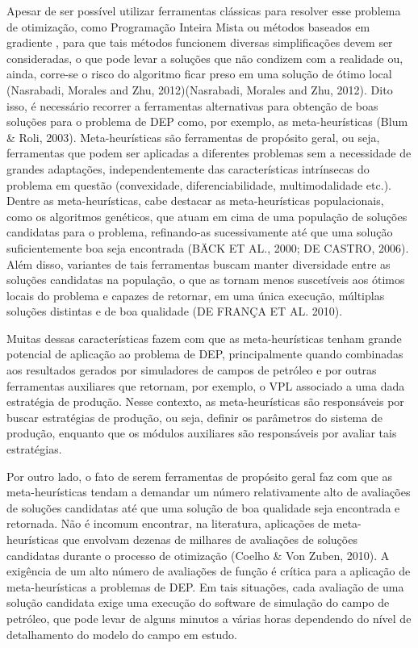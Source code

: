 Apesar de ser possível utilizar ferramentas clássicas para resolver esse problema de otimização, como Programação Inteira Mista \cite{Rosenwald1974} ou métodos baseados em gradiente \cite{Bangerth2006, Handels2007}, para que tais métodos funcionem diversas simplificações devem ser consideradas, o que pode levar a soluções que não condizem com a realidade ou, ainda, corre-se o risco do algoritmo ficar preso em uma solução de ótimo local (Nasrabadi, Morales and Zhu, 2012)(Nasrabadi, Morales and Zhu, 2012). Dito isso, é necessário recorrer a ferramentas alternativas para obtenção de boas soluções para o problema de DEP como, por exemplo, as meta-heurísticas \cite{Blum2003}(Blum \& Roli, 2003). Meta-heurísticas são ferramentas de propósito geral, ou seja, ferramentas que podem ser aplicadas a diferentes problemas sem a necessidade de grandes adaptações, independentemente das características intrínsecas do problema em questão (convexidade, diferenciabilidade, multimodalidade etc.).  Dentre as meta-heurísticas, cabe destacar as meta-heurísticas populacionais, como os algoritmos genéticos, que atuam em cima de uma população de soluções candidatas para o problema, refinando-as sucessivamente até que uma solução suficientemente boa seja encontrada \cite{Back2000, decastro2006-CRC-fundamentals}(BÄCK ET AL., 2000; DE CASTRO, 2006). Além disso, variantes de tais ferramentas buscam manter diversidade entre as soluções candidatas na população, o que as tornam menos suscetíveis aos ótimos locais do problema e capazes de retornar, em uma única execução, múltiplas soluções distintas e de boa qualidade \cite{DeFranca2010}(DE FRANÇA ET AL. 2010).

Muitas dessas características fazem com que as meta-heurísticas tenham grande potencial de aplicação ao problema de DEP, principalmente quando combinadas aos resultados gerados por simuladores de campos de petróleo e por outras ferramentas auxiliares que retornam, por exemplo, o VPL associado a uma dada estratégia de produção. Nesse contexto, as meta-heurísticas são responsáveis por buscar estratégias de produção, ou seja, definir os parâmetros do sistema de produção, enquanto que os módulos auxiliares são responsáveis por avaliar tais estratégias.

Por outro lado, o fato de serem ferramentas de propósito geral faz com que as meta-heurísticas tendam a demandar um número relativamente alto de avaliações de soluções candidatas até que uma solução de boa qualidade seja encontrada e retornada. Não é incomum encontrar, na literatura, aplicações de meta-heurísticas que envolvam dezenas de milhares de avaliações de soluções candidatas durante o processo de otimização \cite{Coelho2010}(Coelho \& Von Zuben, 2010). A exigência de um alto número de avaliações de função é crítica para a aplicação de meta-heurísticas a problemas de DEP. Em tais situações, cada avaliação de uma solução candidata exige uma execução do software de simulação do campo de petróleo, que pode levar de alguns minutos a várias horas dependendo do nível de detalhamento do modelo do campo em estudo. 

